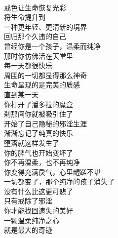 \begin{poem}[温柔纯净之心]
    \begin{multicols}{2}
        \centering~\\
        戒色让生命恢复光彩 \\ 将生命提升到 \\ 一种更年轻、更清新的境界 \\ 回归那个久违的自己 \\ 曾经你是一个孩子，温柔而纯净 \\ 那时你仿佛活在天堂里 \\ 每一天都很快乐 \\ 周围的一切都显得那么神奇 \\ 生命呈现的是完美的质感 \\ 直到某一天 \\ 你打开了潘多拉的魔盒 \\ 刹那间你就被吸引住了 \\ 开始了自己隐秘的邪淫生涯 \\ 渐渐忘记了纯真的快乐 \\ 堕落就这样发生了 \\ 你的脾气也开始变坏了 \\ 你不再温柔，也不再纯净 \\ 你变得充满戾气，心里龌蹉不堪 \\ 一切都变了，那个纯净的孩子消失了 \\ 没有什么比这更可悲了 \\ 只有戒除了邪淫 \\ 你才能找回遗失的美好 \\ 一颗温柔纯净之心 \\ 就是最大的奇迹
    \end{multicols}
\end{poem}

